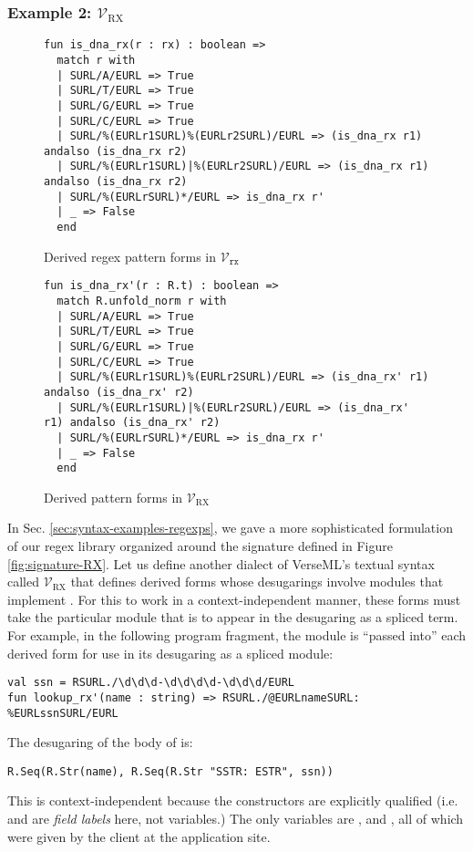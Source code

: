 {\subsubsection{Example 2: $\mathcal{V}_\text{RX}$}
\begin{figure}
\begin{lstlisting}[numbers=none]
fun is_dna_rx(r : rx) : boolean => 
  match r with 
  | SURL/A/EURL => True
  | SURL/T/EURL => True
  | SURL/G/EURL => True
  | SURL/C/EURL => True
  | SURL/%(EURLr1SURL)%(EURLr2SURL)/EURL => (is_dna_rx r1) andalso (is_dna_rx r2)
  | SURL/%(EURLr1SURL)|%(EURLr2SURL)/EURL => (is_dna_rx r1) andalso (is_dna_rx r2)
  | SURL/%(EURLrSURL)*/EURL => is_dna_rx r'
  | _ => False
  end
\end{lstlisting}
\vspace{-5px}
\caption{Derived regex pattern forms in $\mathcal{V}_\texttt{rx}$}
\label{fig:derived-pattern-syntax}
\end{figure}
\begin{figure}
\begin{lstlisting}[numbers=none]
fun is_dna_rx'(r : R.t) : boolean => 
  match R.unfold_norm r with 
  | SURL/A/EURL => True
  | SURL/T/EURL => True
  | SURL/G/EURL => True
  | SURL/C/EURL => True
  | SURL/%(EURLr1SURL)%(EURLr2SURL)/EURL => (is_dna_rx' r1) andalso (is_dna_rx' r2)
  | SURL/%(EURLr1SURL)|%(EURLr2SURL)/EURL => (is_dna_rx' r1) andalso (is_dna_rx' r2)
  | SURL/%(EURLrSURL)*/EURL => is_dna_rx r'
  | _ => False
  end
\end{lstlisting}\vspace{-5px}
\caption{Derived pattern forms in $\mathcal{V}_\text{RX}$}
\label{fig:VRX-pats}
\end{figure}

In Sec. \ref{sec:syntax-examples-regexps}, we gave a more sophisticated formulation of our regex library organized around the signature  defined in Figure \ref{fig:signature-RX}. Let us define another dialect of VerseML's textual syntax called $\mathcal{V}_\text{RX}$ that defines derived forms whose desugarings involve modules that implement . For this to work in a  context-independent manner, these forms must take the particular module that is to appear in the desugaring as a spliced term. For example, in the following program fragment, the module  is ``passed into'' each derived form for use in its desugaring as a spliced module:
\begin{lstlisting}[numbers=none]
val ssn = RSURL./\d\d\d-\d\d\d\d-\d\d\d/EURL
fun lookup_rx'(name : string) => RSURL./@EURLnameSURL: %EURLssnSURL/EURL
\end{lstlisting}
The desugaring of the body of  is:
\begin{lstlisting}[numbers=none]
R.Seq(R.Str(name), R.Seq(R.Str "SSTR: ESTR", ssn))
\end{lstlisting}
This is context-independent because the constructors are explicitly qualified (i.e.  and  are \emph{field labels} here, not variables.) The only variables are ,  and , all of which were given by the client at the application site.

}
